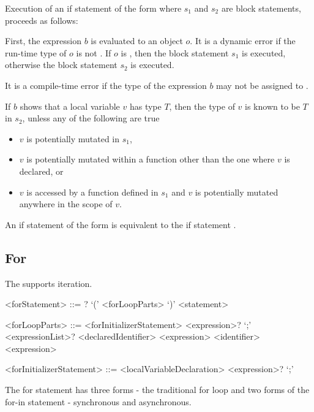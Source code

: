 \documentclass[makeidx]{article}
\begin{document}
{\LMHash{}%
Execution of an if statement of the form  where $s_1$ and $s_2$ are block statements, proceeds as follows:

\LMHash{}%
First, the expression $b$ is evaluated to an object $o$.
It is a dynamic error if the run-time type of $o$ is not .
If $o$ is \TRUE{}, then the block statement $s_1$ is executed, otherwise the block statement $s_2$ is executed.

\LMHash{}%
It is a compile-time error if the type of the expression $b$ may not be assigned to .

\LMHash{}%
If $b$ shows that a local variable $v$ has type $T$,
then the type of $v$ is known to be $T$ in $s_2$,
unless any of the following are true
\begin{itemize}
\item $v$ is potentially mutated in $s_1$,
\item $v$ is potentially mutated within a function other
than the one where $v$ is declared, or
\item $v$ is accessed by a function defined in $s_1$ and
$v$ is potentially mutated anywhere in the scope of $v$.
\end{itemize}

\LMHash{}%
An if statement of the form  is equivalent to the if statement .


\subsection{For}

\LMHash{}%
The  supports iteration.

\begin{grammar}
<forStatement> ::= \AWAIT? \FOR{} `(' <forLoopParts> `)' <statement>

<forLoopParts> ::= <forInitializerStatement> <expression>? `;' <expressionList>?
  \alt <declaredIdentifier> \IN{} <expression>
  \alt <identifier> \IN{} <expression>

<forInitializerStatement> ::= <localVariableDeclaration>
  \alt <expression>? `;'
\end{grammar}

\LMHash{}%
 The for statement has three forms - the traditional for loop and two forms of the for-in statement - synchronous and asynchronous.


}
\end{document}
